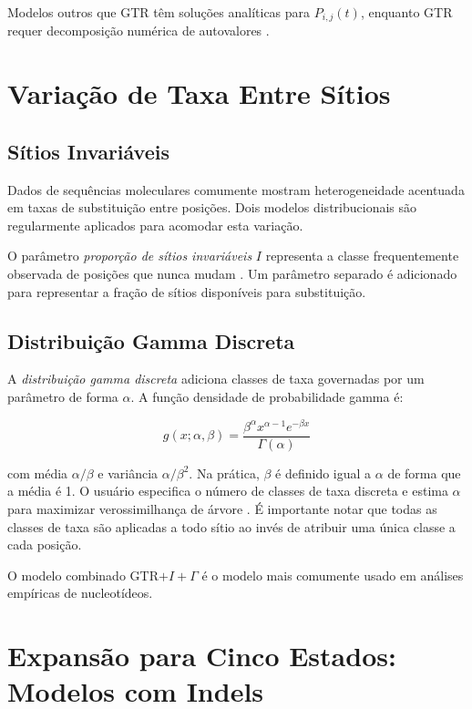 Modelos outros que GTR têm soluções analíticas para $P_{i,j}(t)$, enquanto GTR requer decomposição numérica de autovalores \parencite{wheeler2012}.

\section{Variação de Taxa Entre Sítios}

\subsection{Sítios Invariáveis}

Dados de sequências moleculares comumente mostram heterogeneidade acentuada em taxas de substituição entre posições. Dois modelos distribucionais são regularmente aplicados para acomodar esta variação.

O parâmetro \textit{proporção de sítios invariáveis} $I$ representa a classe frequentemente observada de posições que nunca mudam \parencite{hasegawa1985}. Um parâmetro separado é adicionado para representar a fração de sítios disponíveis para substituição.

\subsection{Distribuição Gamma Discreta}

A \textit{distribuição gamma discreta} \parencite{yang1994} adiciona classes de taxa governadas por um parâmetro de forma $\alpha$. A função densidade de probabilidade gamma é:

$$g(x; \alpha, \beta) = \frac{\beta^{\alpha} x^{\alpha-1} e^{-\beta x}}{\Gamma(\alpha)}$$

com média $\alpha/\beta$ e variância $\alpha/\beta^2$. Na prática, $\beta$ é definido igual a $\alpha$ de forma que a média é 1. O usuário especifica o número de classes de taxa discreta e estima $\alpha$ para maximizar verossimilhança de árvore \parencite{wheeler2012}. É importante notar que todas as classes de taxa são aplicadas a todo sítio ao invés de atribuir uma única classe a cada posição.

O modelo combinado GTR$+I+\Gamma$ é o modelo mais comumente usado em análises empíricas de nucleotídeos.

\section{Expansão para Cinco Estados: Modelos com Indels}

